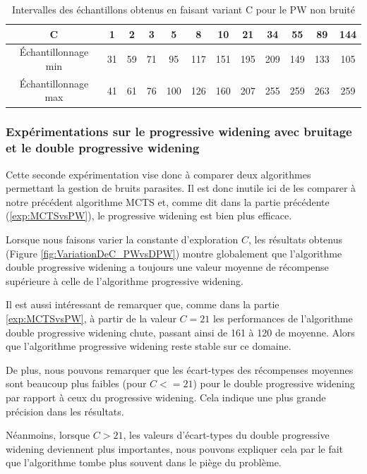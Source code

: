 \documentclass[pdftex,french, english]{article}	%
\begin{document}
    \begin{table}[H]
    		\centering
    		\begin{tabular}{ | *{12}{c|}}
    				\hline
                    C											  & 1 & 2 & 3 & 5 & 8 & 10 & 21 & 34 & 55 & 89 & 144   \\ \hline
                    Échantillonnage min		& 31 & 59 & 71 & 95 &  117 & 151 & 195 & 209 & 149 & 133 & 105   \\ \hline
                    Échantillonnage max	   & 41 & 61 & 76 & 100 & 126 & 160 & 207 & 255 & 259 & 263 & 259   \\ \hline
    		\end{tabular}
			\caption{Intervalles des échantillons obtenus en faisant variant C pour le PW non bruité}\label{tabular:intervalesEchantillonsPWNonBruite}
    \end{table}

	\subsubsection{Expérimentations sur le progressive widening avec bruitage et le double progressive widening} \label{exp:PWvsDPW}
    
    Cette seconde expérimentation vise donc à comparer deux algorithmes permettant la gestion de bruits parasites. Il est donc inutile ici de les comparer à notre précédent algorithme MCTS et, comme dit dans la partie précédente (\ref{exp:MCTSvsPW}), le progressive widening est bien plus efficace.
    
    Lorsque nous faisons varier la constante d'exploration $C$, les résultats obtenus (Figure \ref{fig:VariationDeC_PWvsDPW}) montre globalement que l'algorithme double progressive widening a toujours une valeur moyenne de récompense supérieure à celle de l'algorithme progressive widening. 
    
    Il est aussi intéressant de remarquer que, comme dans la partie \ref{exp:MCTSvsPW}, à partir de la valeur $C=21$ les performances de l'algorithme double progressive widening chute, passant ainsi de 161 à 120 de moyenne. Alors que l'algorithme progressive widening reste stable sur ce domaine. 
    
    De plus, nous pouvons remarquer que les écart-types des récompenses moyennes sont beaucoup plus faibles (pour $C <= 21$) pour le double progressive widening par rapport à ceux du progressive widening. 
    Cela indique une plus grande précision dans les résultats. 
    
    Néanmoins, lorsque $C>21$, les valeurs d'écart-types du double progressive widening deviennent plus importantes, nous pouvons expliquer cela par le fait que l'algorithme tombe plus souvent dans le piège du problème. 
    
\end{document}
